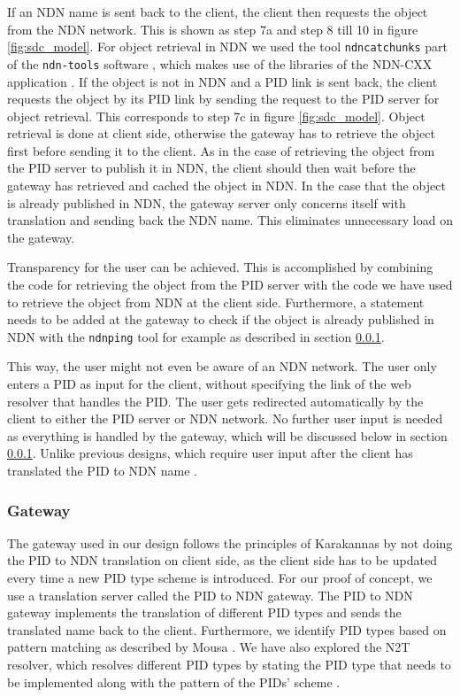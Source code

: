 If an NDN name is sent back to the client, the client then requests the object from the NDN network. This is shown as step 7a and step 8 till 10 in figure \ref{fig:sdc_model}. For object retrieval in NDN we used the tool \texttt{ndncatchunks} part of the \texttt{ndn-tools} software \cite{ndn-tools}, which makes use of the libraries of the NDN-CXX application \cite{ndn-tools}. 
If the object is not in NDN and a PID link is sent back, the client requests the object by its PID link by sending the request to the PID server for object retrieval. This corresponds to step 7c in figure \ref{fig:sdc_model}. Object retrieval is done at client side, otherwise the gateway has to retrieve the object first before sending it to the client. 
As in the case of retrieving the object from the PID server to publish it in NDN, the client should then wait before the gateway has retrieved and cached the object in NDN. 
In the case that the object is already published in NDN, the gateway server only concerns itself with translation and sending back the NDN name. This eliminates unnecessary load on the gateway.

Transparency for the user can be achieved. This is accomplished by combining the code for retrieving the object from the PID server with the code we have used to retrieve the object from NDN at the client side. Furthermore, a statement needs to be added at the gateway to check if the object is already published in NDN with the \texttt{ndnping} tool \cite{ndn-tools} for example as described in section \ref{gw}. 

This way, the user might not even be aware of an NDN network. The user only enters a PID as input for the client, without specifying the link of the web resolver that handles the PID. The user gets redirected automatically by the client to either the PID server or NDN network. No further user input is needed as everything is handled by the gateway, which will be discussed below in section \ref{gw}. 
Unlike previous designs, which require user input after the client has translated the PID to NDN name \cite{ndn-app-aware}. 

\subsubsection{Gateway}\label{gw}
The gateway used in our design follows the principles of Karakannas by not doing the PID to NDN translation on client side, as the client side has to be updated every time a new PID type scheme is introduced. For our proof of concept, we use a translation server called the PID to NDN gateway. The PID to NDN gateway implements the translation of different PID types and sends the translated name back to the client. Furthermore, we identify PID types based on pattern matching as described by Mousa \cite{ndn-app-aware}. We have also explored the N2T resolver, which resolves different PID types by stating the PID type that needs to be implemented along with the pattern of the PIDs' scheme \cite{n2t}.

